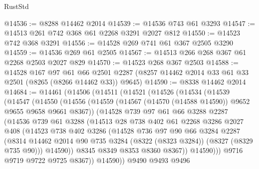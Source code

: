 \begin{lexlean}{RustStd}
\begin{coremodule}
@14536 := @8288 @14462 @2014
@14539 := @14536 @743 @61 @3293
@14547 := @14513 @261 @742 @368 @61 @2268 @3291 @2027 @812
@14550 := @14523 @742 @368 @3291
@14556 := @14528 @269 @741 @61 @367 @2505 @3290
@14559 := @14536 @269 @61 @2505
@14567 := @14513 @266 @268 @367 @61 @2268 @2503 @2027 @829
@14570 := @14523 @268 @367 @2503
@14588 := @14528
    @167
    @97
    @61
    @66
    @2501
    @2287
    (@8257 @14462 @2014 @33 @61 @33 @2501 (@8265 (@8266 @14462 @33)) @9645)
@14590 := @8338 @14462 @2014
@14684 := @14461
    (@14506
      (@14511
        (@14521
          (@14526
            (@14534
              (@14539
                (@14547
                  (@14550
                    (@14556
                      (@14559 (@14567 (@14570 (@14588 @14590)) @9652 @9655 @9658 @9661 @8367))
                      (@14528
                        @739
                        @97
                        @61
                        @66
                        @3288
                        @2287
                        (@14536
                          @739
                          @61
                          @3288
                          (@14513
                            @28
                            @738
                            @402
                            @61
                            @2268
                            @3286
                            @2027
                            @408
                            (@14523
                              @738
                              @402
                              @3286
                              (@14528
                                @736
                                @97
                                @90
                                @66
                                @3284
                                @2287
                                (@8314
                                  @14462
                                  @2014
                                  @90
                                  @735
                                  @3284
                                  (@8322 (@8323 @3284))
                                  (@8327 (@8329 @735 @90)))
                                @14590))
                            @8345
                            @8349
                            @8353
                            @8360
                            @8367))
                        @14590)))
                  @9716
                  @9719
                  @9722
                  @9725
                  @8367))
              @14590))
          @9490
          @9493
          @9496

\end{coremodule}
\end{lexlean}

